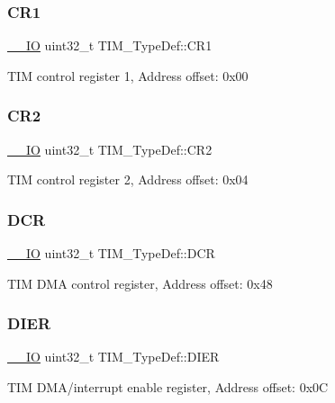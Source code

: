 \subsubsection{\texorpdfstring{CR1}{CR1}}
{\footnotesize\ttfamily \mbox{\hyperlink{core__sc300_8h_aec43007d9998a0a0e01faede4133d6be}{\+\_\+\+\_\+\+IO}} uint32\+\_\+t T\+I\+M\+\_\+\+Type\+Def\+::\+C\+R1}

T\+IM control register 1, Address offset\+: 0x00 \mbox{\label{struct_t_i_m___type_def_a6b1ae85138ed91686bf63699c61ef835}} 
\subsubsection{\texorpdfstring{CR2}{CR2}}
{\footnotesize\ttfamily \mbox{\hyperlink{core__sc300_8h_aec43007d9998a0a0e01faede4133d6be}{\+\_\+\+\_\+\+IO}} uint32\+\_\+t T\+I\+M\+\_\+\+Type\+Def\+::\+C\+R2}

T\+IM control register 2, Address offset\+: 0x04 \mbox{\label{struct_t_i_m___type_def_a7efe9ea8067044cac449ada756ebc2d1}} 
\subsubsection{\texorpdfstring{DCR}{DCR}}
{\footnotesize\ttfamily \mbox{\hyperlink{core__sc300_8h_aec43007d9998a0a0e01faede4133d6be}{\+\_\+\+\_\+\+IO}} uint32\+\_\+t T\+I\+M\+\_\+\+Type\+Def\+::\+D\+CR}

T\+IM D\+MA control register, Address offset\+: 0x48 \mbox{\label{struct_t_i_m___type_def_a22a33c78ca5bec0e3e8559164a82b8ef}} 
\subsubsection{\texorpdfstring{DIER}{DIER}}
{\footnotesize\ttfamily \mbox{\hyperlink{core__sc300_8h_aec43007d9998a0a0e01faede4133d6be}{\+\_\+\+\_\+\+IO}} uint32\+\_\+t T\+I\+M\+\_\+\+Type\+Def\+::\+D\+I\+ER}

T\+IM D\+M\+A/interrupt enable register, Address offset\+: 0x0C \mbox{\label{struct_t_i_m___type_def_afb7114ac49dba07ba5d250c507dbf23d}} 
